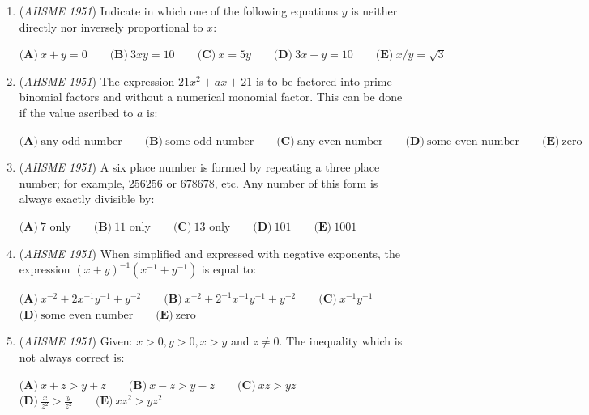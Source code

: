 \begin{enumerate}
 
 \[f(x) \equiv ax^2 + bx + c = 0,\]


 it happens that $c = \frac{b^2}{4a}$, then the graph of $y = f(x)$ will certainly:


 $\textbf{(A)}\ \text{have a maximum}\qquad\textbf{(B)}\ \text{have a minimum}\qquad\textbf{(C)}\ \text{be tangent to the x-axis}\\ \qquad\textbf{(D)}\ \text{be tangent to the y-axis}\qquad\textbf{(E)}\ \text{lie in one quadrant only}$


	\item (\textit{AHSME 1951}) Indicate in which one of the following equations $y$ is neither directly nor inversely proportional to $x$: 


 $\textbf{(A)}\ x+y = 0\qquad\textbf{(B)}\ 3xy = 10\qquad\textbf{(C)}\ x = 5y \qquad\textbf{(D)}\ 3x+y = 10 \qquad\textbf{(E)}\ x/y = \sqrt{3}\qquad$


	\item (\textit{AHSME 1951}) The expression $21x^2+ax+21$ is to be factored into prime binomial factors and without a numerical monomial factor. This can be done if the value ascribed to $a$ is:


 $\textbf{(A)}\ \text{any odd number}\qquad\textbf{(B)}\ \text{some odd number}\qquad\textbf{(C)}\ \text{any even number}\qquad\textbf{(D)}\ \text{some even number}\qquad\textbf{(E)}\ \text{zero}$


	\item (\textit{AHSME 1951}) A six place number is formed by repeating a three place number; for example, $256256$ or $678678$, etc. Any number of this form is always exactly divisible by: 


 $\textbf{(A)}\ 7\text{ only}\qquad\textbf{(B)}\ 11\text{ only}\qquad\textbf{(C)}\ 13\text{ only}\qquad\textbf{(D)}\ 101\qquad\textbf{(E)}\ 1001$


	\item (\textit{AHSME 1951}) When simplified and expressed with negative exponents, the expression $(x+y)^{-1}(x^{-1}+y^{-1})$ is equal to: 


 $\textbf{(A)}\ x^{-2}+2x^{-1}y^{-1}+y^{-2}\qquad\textbf{(B)}\ x^{-2}+2^{-1}x^{-1}y^{-1}+y^{-2}\qquad\textbf{(C)}\ x^{-1}y^{-1}$
$\textbf{(D)}\ \text{some even number}\qquad\textbf{(E)}\ \text{zero}$


	\item (\textit{AHSME 1951}) Given: $x > 0, y > 0, x > y$ and $z\not = 0$. The inequality which is not always correct is: 


 $\textbf{(A)}\ x+z > y+z\qquad\textbf{(B)}\ x-z > y-z\qquad\textbf{(C)}\ xz > yz$
$\textbf{(D)}\ \frac{x}{z^{2}}>\frac{y}{z^{2}}\qquad\textbf{(E)}\ xz^{2}> yz^{2}$



\end{enumerate}
